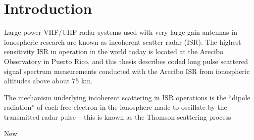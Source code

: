 \chapter{Introduction}
Large power VHF/UHF radar systems used with very large gain antennas in ionospheric research are known as incoherent scatter radar (ISR). The highest sensitivity ISR in operation in the world today is located at the Arecibo Observatory in Puerto Rico, and this thesis describes coded long pulse scattered signal spectrum measurements conducted with the Arecibo ISR from ionospheric altitudes above about 75 km.

The mechanism underlying incoherent scattering in ISR operations is the ``dipole radiation'' of each free electron in the ionosphere made to oscillate by the transmitted radar pulse -- this is known as the Thomson scattering process

New